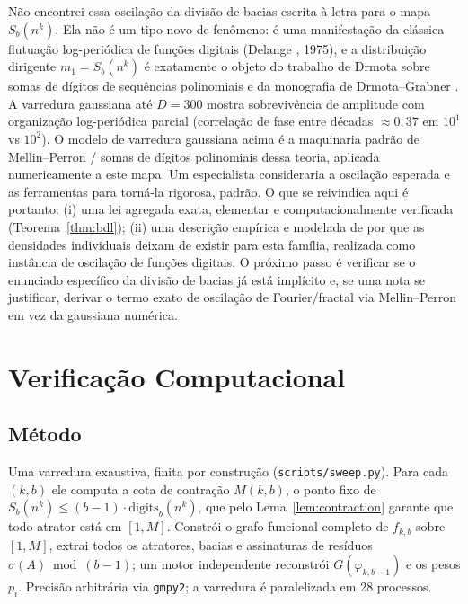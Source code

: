 \documentclass[11pt]{article}
\theoremstyle{definition}
\theoremstyle{remark}
\begin{document}
Não encontrei essa oscilação da divisão de bacias escrita à letra para o mapa $S_b(n^k)$. Ela não é um tipo novo de fenômeno: é uma manifestação da clássica flutuação log-periódica de funções digitais (Delange \cite{delange}, 1975), e a distribuição dirigente $m_1 = S_b(n^k)$ é exatamente o objeto do trabalho de Drmota sobre somas de dígitos de sequências polinomiais \cite{drmota-poly} e da monografia de Drmota--Grabner \cite{drmota-grabner}. A varredura gaussiana até $D=300$ mostra sobrevivência de amplitude com organização log-periódica parcial (correlação de fase entre décadas $\approx 0{,}37$ em $10^1$ vs $10^2$). O modelo de varredura gaussiana acima é a maquinaria padrão de Mellin--Perron / somas de dígitos polinomiais dessa teoria, aplicada numericamente a este mapa. Um especialista consideraria a oscilação esperada e as ferramentas para torná-la rigorosa, padrão. O que se reivindica aqui é portanto: (i) uma lei agregada exata, elementar e computacionalmente verificada (Teorema~\ref{thm:bdl}); (ii) uma descrição empírica e modelada de por que as densidades individuais deixam de existir para esta família, realizada como instância de oscilação de funções digitais. O próximo passo é verificar \cite{delange,drmota-poly,drmota-grabner} se o enunciado específico da divisão de bacias já está implícito e, se uma nota se justificar, derivar o termo exato de oscilação de Fourier/fractal via Mellin--Perron em vez da gaussiana numérica.

\section{Verificação Computacional}\label{sec:verification}

\subsection{Método}

Uma varredura exaustiva, finita por construção (\texttt{scripts/sweep.py}). Para cada $(k,b)$ ele computa a cota de contração $M(k,b)$, o ponto fixo de $S_b(n^k) \le (b-1)\cdot\mathrm{digits}_b(n^k)$, que pelo Lema~\ref{lem:contraction} garante que todo atrator está em $[1,M]$. Constrói o grafo funcional completo de $f_{k,b}$ sobre $[1,M]$, extrai todos os atratores, bacias e assinaturas de resíduos $\sigma(A) \bmod (b-1)$; um motor independente reconstrói $G(\varphi_{k,b-1})$ e os pesos $p_i$. Precisão arbitrária via \texttt{gmpy2}; a varredura é paralelizada em 28 processos.
\end{document}
